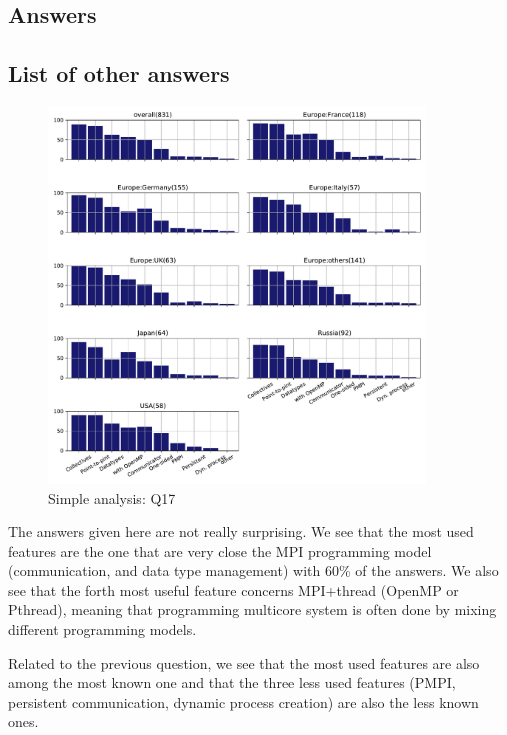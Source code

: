 
\subsection{Answers}



\subsection{List of other answers}
\begin{itemize}

\end{itemize}

\begin{figure}[htb]
\begin{center}
\includegraphics[width=10cm]{../pdfs/Q17.pdf}
\caption{Simple analysis: Q17}
\label{fig:Q17}
\end{center}
\end{figure}

The answers given here are not really surprising. We see that the most used
features are the one that are very close the MPI programming model
(communication, and data type management) with 60\% of the answers. We also see
that the forth most useful feature concerns MPI+thread (OpenMP or Pthread),
meaning that programming multicore system is often done by mixing different
programming models.  

Related to the previous question, we see that the most used features are also
among the most known one and that the three less used features (PMPI, persistent
communication, dynamic process creation) are also the less known ones. 
